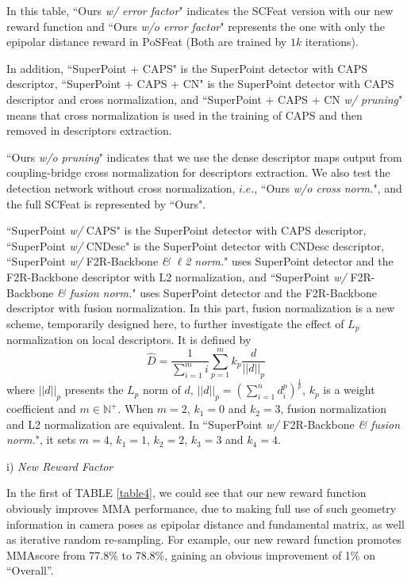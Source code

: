 \documentclass[journal]{IEEEtran}
\begin{document}
In this table, ``Ours \textit{w/ error factor}" indicates the SCFeat version with our new reward function and ``Ours \textit{w/o error factor}" represents the one with only the epipolar distance reward in PoSFeat \cite{li2022decoupling} (Both are trained by $1k$ iterations).

In addition, ``SuperPoint + CAPS" is the SuperPoint \cite{SuperPoint} detector with CAPS \cite{caps} descriptor, ``SuperPoint + CAPS + CN" is the SuperPoint detector with CAPS descriptor and cross normalization,
and ``SuperPoint + CAPS + CN \textit{w/ pruning}" means that cross normalization is used in the training of CAPS and then removed in descriptors extraction.


``Ours \textit{w/o pruning}" indicates that we use the dense descriptor maps output from coupling-bridge cross normalization for descriptors extraction. We also test the detection network without cross normalization, $i.e.$, ``Ours \textit{w/o cross norm.}", and the full SCFeat is represented by ``Ours".


``SuperPoint \textit{w/} CAPS" is the SuperPoint detector with CAPS descriptor, ``SuperPoint \textit{w/} CNDesc" is the SuperPoint detector with CNDesc \cite{cndesc} descriptor, ``SuperPoint \textit{w/} F2R-Backbone \textit{\& $\ell$2 norm.}" uses SuperPoint detector and the F2R-Backbone descriptor with L2 normalization, and ``SuperPoint \textit{w/} F2R-Backbone \textit{\& fusion norm.}" uses SuperPoint detector and the F2R-Backbone descriptor with fusion normalization. In this part, fusion normalization is a new scheme, temporarily designed here, to further investigate the effect of $L_p$ normalization on local descriptors. It is defined by
\begin{equation}\label{eq-fusion-norm}
        \hat{D}=\frac{1}{\sum_{i=1}^{m}i}\sum_{p=1}^{m}{k_{p}\frac{d}{||d||_{p}}}
\end{equation}
where $||d||_{p}$ presents the $L_{p}$ norm of $d$, $||d||_{p}=({\sum_{i=1}^{n} d_{i}^{p}})^{\frac{1}{p}}$, $k_{p}$ is a weight coefficient and $m\in \mathbb{N}^{+}$.
When $m=2$, $k_1=0$ and $k_2=3$, fusion normalization and L2 normalization are equivalent. In ``SuperPoint \textit{w/} F2R-Backbone \textit{\& fusion norm.}", it sets $m=4$, $k_1=1$, $k_2=2$, $k_3=3$ and $k_4=4$.



i) \emph{New Reward Factor}  


In the first of TABLE \ref{table4}, we could see that our new reward function obviously improves MMA performance, due to making full use of such geometry information in camera poses as epipolar distance and fundamental matrix, as well as iterative random re-sampling. For example, our new reward function promotes MMAscore from 77.8\% to 78.8\%, gaining an obvious improvement of 1\% on ``Overall''. 
\end{document}
